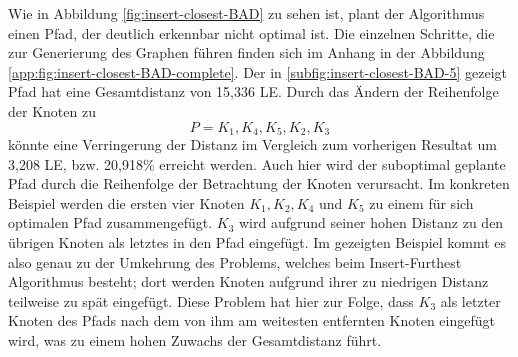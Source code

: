 Wie in Abbildung \vref{fig:insert-closest-BAD} zu sehen ist, plant der Algorithmus einen Pfad, der deutlich erkennbar nicht optimal ist.
Die einzelnen Schritte, die zur Generierung des Graphen führen finden sich im Anhang in der Abbildung \vref{app:fig:insert-closest-BAD-complete}.
Der in \vref{subfig:insert-closest-BAD-5} gezeigt Pfad hat eine Gesamtdistanz von 15,336 \ac{LE}.
Durch das Ändern der Reihenfolge der Knoten zu
    $$P=K_1, K_4, K_5, K_2, K_3$$ 
könnte eine Verringerung der Distanz im Vergleich zum vorherigen Resultat um 3,208 \ac{LE}, bzw. 20,918\% erreicht werden.
Auch hier wird der suboptimal geplante Pfad durch die Reihenfolge der Betrachtung der Knoten verursacht.
Im konkreten Beispiel werden die ersten vier Knoten $K_1, K_2, K_4$ und $K_5$ zu einem für sich optimalen Pfad zusammengefügt.
$K_3$ wird aufgrund seiner hohen Distanz zu den übrigen Knoten als letztes in den Pfad eingefügt.
Im gezeigten Beispiel kommt es also genau zu der Umkehrung des Problems, welches beim Insert-Furthest Algorithmus besteht; dort werden Knoten aufgrund ihrer zu niedrigen Distanz teilweise zu spät eingefügt.
Diese Problem hat hier zur Folge, dass $K_3$ als letzter Knoten des Pfads nach dem von ihm am weitesten entfernten Knoten eingefügt wird, was zu einem hohen Zuwachs der Gesamtdistanz führt.
